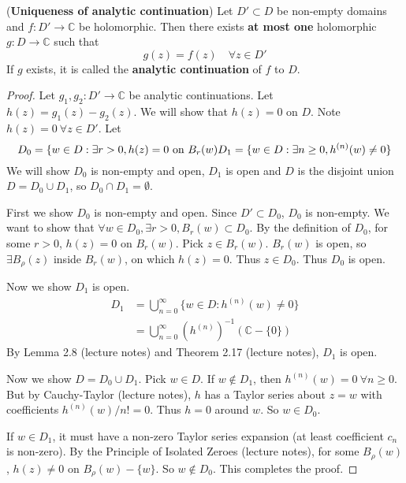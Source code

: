 \begin{theorem}
	(\textbf{Uniqueness of analytic continuation}) Let $D' \subset D$ be non-empty domains and $f: D' \rightarrow \mathbb{C}$ be holomorphic. Then there exists \textbf{at most one} holomorphic $g: D \rightarrow \mathbb{C}$ such that
	\[
		g(z) = f(z) \quad \forall z \in D'
	\]
	If $g$ exists, it is called the \textbf{analytic continuation} of $f$ to $D$.
\end{theorem}

\begin{proof}
	Let $g_1, g_2: D' \rightarrow \mathbb{C}$ be analytic continuations. Let $h(z) = g_1(z) - g_2(z)$. We will show that $h(z) = 0$ on $D$. Note $h(z) = 0 \ \forall z \in D'$. Let
	\[
		D_0 = \{ w \in D: \exists r > 0, h(z) = 0 \text{ on } B_r(w) \\
		D_1 = \{ w \in D: \exists n \ge 0, h^{(n)}(w) \ne 0 \}
	\]
	We will show $D_0$ is non-empty and open, $D_1$ is open and $D$ is the disjoint union $D = D_0 \cup D_1$, so $D_0 \cap D_1 = \emptyset$.

	First we show $D_0$ is non-empty and open. Since $D' \subset D_0$, $D_0$ is non-empty. We want to show that $\forall w \in D_0, \exists r > 0, B_r(w) \subset D_0$. By the definition of $D_0$, for some $r > 0$, $h(z) = 0$ on $B_r(w)$. Pick $z \in B_r(w)$. $B_r(w)$ is open, so $\exists B_{\rho} (z)$ inside $B_r(w)$, on which $h(z) = 0$. Thus $z \in D_0$. Thus $D_0$ is open.

	Now we show $D_1$ is open.
	\[
		\begin{aligned}
			D_1
				& = \bigcup_{n = 0}^{\infty} \{ w \in D: h^{(n)}(w) \ne 0 \} \\
				& = \bigcup_{n = 0}^{\infty} {\left( h^{(n)} \right)}^{-1} (\mathbb{C} - \{ 0 \})
		\end{aligned}
	\]
	By Lemma 2.8 (lecture notes) and Theorem 2.17 (lecture notes), $D_1$ is open.

	Now we show $D = D_0 \cup D_1$. Pick $w \in D$. If $w \notin D_1$, then $h^{(n)}(w) = 0 \ \forall n \ge 0$. But by Cauchy-Taylor (lecture notes), $h$ has a Taylor series about $z = w$ with coefficients $h^{(n)}(w) / n! = 0$. Thus $h = 0$ around $w$. So $w \in D_0$.

	If $w \in D_1$, it must have a non-zero Taylor series expansion (at least coefficient $c_n$ is non-zero). By the Principle of Isolated Zeroes (lecture notes), for some $B_{\rho}(w)$, $h(z) \ne 0$ on $B_{\rho}(w) - \{ w \}$. So $w \notin D_0$. This completes the proof.
\end{proof}

